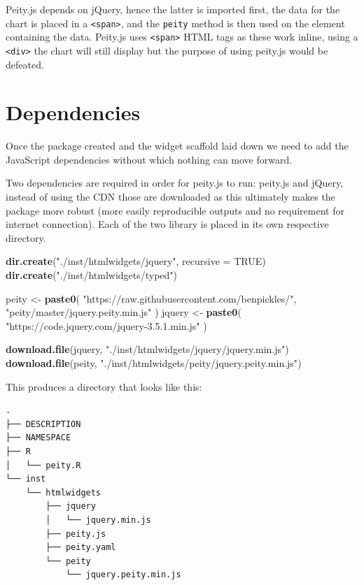 \documentclass[
]{krantz}
\makeatletter
\newenvironment{Shaded}{\begin{snugshade}}{\end{snugshade}}
\newcommand{\DataTypeTok}[1]{\textcolor[rgb]{0.27,0.27,0.27}{#1}}
\newcommand{\KeywordTok}[1]{\textcolor[rgb]{0.27,0.27,0.27}{\textbf{#1}}}
\newcommand{\NormalTok}[1]{#1}
\newcommand{\OtherTok}[1]{\textcolor[rgb]{0.37,0.37,0.37}{#1}}
\newcommand{\StringTok}[1]{\textcolor[rgb]{0.5,0.5,0.5}{#1}}
\newenvironment{kframe}{%
\medskip{}
\setlength{\fboxsep}{.8em}
 \def\at@end@of@kframe{}%
 \ifinner\ifhmode%
  \def\at@end@of@kframe{\end{minipage}}%
  \begin{minipage}{\columnwidth}%
 \fi\fi%
 \def\FrameCommand##1{\hskip\@totalleftmargin \hskip-\fboxsep
 \colorbox{shadecolor}{##1}\hskip-\fboxsep
     \hskip-\linewidth \hskip-\@totalleftmargin \hskip\columnwidth}%
 \MakeFramed {\advance\hsize-\width
   \@totalleftmargin\z@ \linewidth\hsize
   \@setminipage}}%
 {\par\unskip\endMakeFramed%
 \at@end@of@kframe}
\renewenvironment{Shaded}{\begin{kframe}}{\end{kframe}}
\makeatother
\begin{document}
Peity.js depends on jQuery, hence the latter is imported first, the data for the chart is placed in a \texttt{\textless{}span\textgreater{}}, and the \texttt{peity} method is then used on the element containing the data. Peity.js uses \texttt{\textless{}span\textgreater{}} HTML tags as these work inline, using a \texttt{\textless{}div\textgreater{}} the chart will still display but the purpose of using peity.js would be defeated.

\hypertarget{widgets-realistic-deps}{%
\section{Dependencies}\label{widgets-realistic-deps}}

Once the package created and the widget scaffold laid down we need to add the JavaScript dependencies without which nothing can move forward.

Two dependencies are required in order for peity.js to run: peity.js and jQuery, instead of using the CDN those are downloaded as this ultimately makes the package more robust (more easily reproducible outputs and no requirement for internet connection). Each of the two library is placed in its own respective directory.

\begin{Shaded}
\begin{Highlighting}[]
\KeywordTok{dir.create}\NormalTok{(}\StringTok{"./inst/htmlwidgets/jquery"}\NormalTok{, }\DataTypeTok{recursive =} \OtherTok{TRUE}\NormalTok{)}
\KeywordTok{dir.create}\NormalTok{(}\StringTok{"./inst/htmlwidgets/typed"}\NormalTok{)}

\NormalTok{peity \textless{}{-}}\StringTok{ }\KeywordTok{paste0}\NormalTok{(}
  \StringTok{"https://raw.githubusercontent.com/benpickles/"}\NormalTok{,}
  \StringTok{"peity/master/jquery.peity.min.js"}
\NormalTok{)}
\NormalTok{jquery \textless{}{-}}\StringTok{ }\KeywordTok{paste0}\NormalTok{(}
  \StringTok{"https://code.jquery.com/jquery{-}3.5.1.min.js"}
\NormalTok{)}

\KeywordTok{download.file}\NormalTok{(jquery, }\StringTok{"./inst/htmlwidgets/jquery/jquery.min.js"}\NormalTok{)}
\KeywordTok{download.file}\NormalTok{(peity, }\StringTok{"./inst/htmlwidgets/peity/jquery.peity.min.js"}\NormalTok{)}
\end{Highlighting}
\end{Shaded}

This produces a directory that looks like this:

\begin{verbatim}
.
├── DESCRIPTION
├── NAMESPACE
├── R
│   └── peity.R
└── inst
    └── htmlwidgets
        ├── jquery
        │   └── jquery.min.js
        ├── peity.js
        ├── peity.yaml
        └── peity
            └── jquery.peity.min.js
\end{verbatim}
\end{document}
